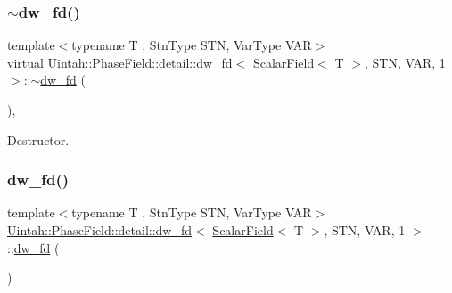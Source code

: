 \subsubsection{\texorpdfstring{$\sim$dw\+\_\+fd()}{~dw\_fd()}}
{\footnotesize\ttfamily template$<$typename T , Stn\+Type S\+TN, Var\+Type V\+AR$>$ \\
virtual \hyperlink{classUintah_1_1PhaseField_1_1detail_1_1dw__fd}{Uintah\+::\+Phase\+Field\+::detail\+::dw\+\_\+fd}$<$ \hyperlink{structUintah_1_1PhaseField_1_1ScalarField}{Scalar\+Field}$<$ T $>$, S\+TN, V\+AR, 1 $>$\+::$\sim$\hyperlink{classUintah_1_1PhaseField_1_1detail_1_1dw__fd}{dw\+\_\+fd} (\begin{DoxyParamCaption}{ }\end{DoxyParamCaption})\hspace{0.3cm}{\ttfamily [inline]}, {\ttfamily [virtual]}}



Destructor. 

\mbox{\label{classUintah_1_1PhaseField_1_1detail_1_1dw__fd_3_01ScalarField_3_01T_01_4_00_01STN_00_01VAR_00_011_01_4_ad0b66fa4134e4de6b7e0ad9258d42f0d}} 
\subsubsection{\texorpdfstring{dw\+\_\+fd()}{dw\_fd()}\hspace{0.1cm}{\footnotesize\ttfamily [4/4]}}
{\footnotesize\ttfamily template$<$typename T , Stn\+Type S\+TN, Var\+Type V\+AR$>$ \\
\hyperlink{classUintah_1_1PhaseField_1_1detail_1_1dw__fd}{Uintah\+::\+Phase\+Field\+::detail\+::dw\+\_\+fd}$<$ \hyperlink{structUintah_1_1PhaseField_1_1ScalarField}{Scalar\+Field}$<$ T $>$, S\+TN, V\+AR, 1 $>$\+::\hyperlink{classUintah_1_1PhaseField_1_1detail_1_1dw__fd}{dw\+\_\+fd} (\begin{DoxyParamCaption}\item[{const \hyperlink{classUintah_1_1PhaseField_1_1detail_1_1dw__fd}{dw\+\_\+fd}$<$ \hyperlink{structUintah_1_1PhaseField_1_1ScalarField}{Scalar\+Field}$<$ T $>$, S\+TN, V\+AR, 1 $>$ \&}]{ }\end{DoxyParamCaption})\hspace{0.3cm}{\ttfamily [delete]}}



